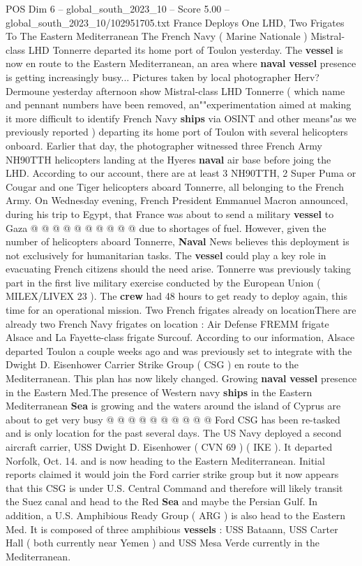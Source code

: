 \begin{textsample}{POS Dim 6 – global\_south\_2023\_10 – Score 5.00 – global\_south\_2023\_10/102951705.txt}  \label{ex:f6_pos_242}
France Deploys One LHD, Two Frigates To The Eastern Mediterranean The French Navy ( Marine Nationale ) Mistral-class LHD Tonnerre departed its home port of Toulon yesterday.
The \textbf{vessel} is now en route to the Eastern Mediterranean, an area where \textbf{naval} \textbf{vessel} presence is getting increasingly busy...
Pictures taken by local photographer Herv?
Dermoune yesterday afternoon show Mistral-class LHD Tonnerre ( which name and pennant numbers have been removed, an""experimentation aimed at making it more difficult to identify French Navy \textbf{ships} via OSINT and other means"as we previously reported ) departing its home port of Toulon with several helicopters onboard.
Earlier that day, the photographer witnessed three French Army NH90TTH helicopters landing at the Hyeres \textbf{naval} air base before joing the LHD.
According to our account, there are at least 3 NH90TTH, 2 Super Puma or Cougar and one Tiger helicopters aboard Tonnerre, all belonging to the French Army.
On Wednesday evening, French President Emmanuel Macron announced, during his trip to Egypt, that France was about to send a military \textbf{vessel} to Gaza @ @ @ @ @ @ @ @ @ @ due to shortages of fuel.
However, given the number of helicopters aboard Tonnerre, \textbf{Naval} News believes this deployment is not exclusively for humanitarian tasks.
The \textbf{vessel} could play a key role in evacuating French citizens should the need arise.
Tonnerre was previously taking part in the first live military exercise conducted by the European Union ( MILEX/LIVEX 23 ).
The \textbf{crew} had 48 hours to get ready to deploy again, this time for an operational mission.
Two French frigates already on locationThere are already two French Navy frigates on location : Air Defense FREMM frigate Alsace and La Fayette-class frigate Surcouf.
According to our information, Alsace departed Toulon a couple weeks ago and was previously set to integrate with the Dwight D.
Eisenhower Carrier Strike Group ( CSG ) en route to the Mediterranean.
This plan has now likely changed.
Growing \textbf{naval} \textbf{vessel} presence in the Eastern Med.The presence of Western navy \textbf{ships} in the Eastern Mediterranean \textbf{Sea} is growing and the waters around the island of Cyprus are about to get very busy @ @ @ @ @ @ @ @ @ @ Ford CSG has been re-tasked and is only location for the past several days.
The US Navy deployed a second aircraft carrier, USS Dwight D.
Eisenhower ( CVN 69 ) ( IKE ).
It departed Norfolk, Oct. 14. and is now heading to the Eastern Mediterranean.
Initial reports claimed it would join the Ford carrier strike group but it now appears that this CSG is under U.S.
Central Command and therefore will likely transit the Suez canal and head to the Red \textbf{Sea} and maybe the Persian Gulf.
In addition, a U.S.
Amphibious Ready Group ( ARG ) is also head to the Eastern Med.
It is composed of three amphibious \textbf{vessels} : USS Bataann, USS Carter Hall ( both currently near Yemen ) and USS Mesa Verde currently in the Mediterranean.

\end{textsample}
